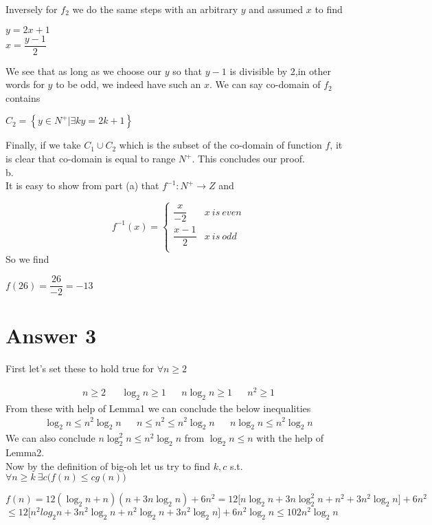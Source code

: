 \documentclass[12pt]{article}
\begin{document}
Inversely for $f_2$ we do the same steps with an arbitrary $y$ and assumed $x$ to find
\begin{center}
$y=2x+1$\\$x=\dfrac{y-1}{2}$
\end{center}
We see that as long as we choose our $y$ so that $y-1$ is divisible by 2,in other words for $y$ to be odd, we indeed have such an $x$. We can say co-domain of $f_2$ contains
\begin{center}
$C_2=\left\{{y\in N^+|\exists k y=2k+1}\right\}$
\end{center}
Finally, if we take $C_1\cup C_2$ which is the subset of the co-domain of function $f$, it is clear that co-domain is equal to range $N^+$. This concludes our proof.\\
b.\\
It is easy to show from part (a) that $f^{-1}:N^+\to Z$ and

\[f^{-1}(x)= \begin{cases} 
      \dfrac{x}{-2} & x\: is\: even \\
      \dfrac{x-1}{2} & x\:is\:odd\\
   
   \end{cases}
\]
So we find
\begin{center}
$f(26)=\dfrac{26}{-2}=-13$
\end{center}




\section*{Answer 3}

First let's set these to hold true for $\forall n \geq 2$

\begin{align*}
n\geq 2 && \log_2n\geq 1 && n\log_2n\geq 1 && n^2\geq 1
\end{align*}
From these with help of Lemma1 we can conclude the below inequalities
\begin{align*}
\log_2n\leq n^2\log_2n && n\leq n^2\leq n^2\log_2n && n\log_2n\leq n^2\log_2n
\end{align*}
We can also conclude $n\log^2_2n\leq n^2\log_2n$ from $\log_2n\leq n$ with the help of Lemma2.\\
Now by the definition of big-oh let us try to find $k,c$ s.t. $\forall n\geq k\: \exists c\big (f(n)\leq cg(n)\big )$


\begin{center}
$f(n)= 12(\log_2n+n)(n+3n\log_2n)+6n^2 =12\big [ n\log_2n+3n\log_2^2n+n^2+3n^2\log_2n \big ]+6n^2$\\$ \leq 12\big [n^2log_2n+3n^2\log_2n+n^2\log_2n+3n^2\log_2n\big ] +6n^2\log_2n \leq 102n^2\log_2n$
\end{center}
\end{document}
